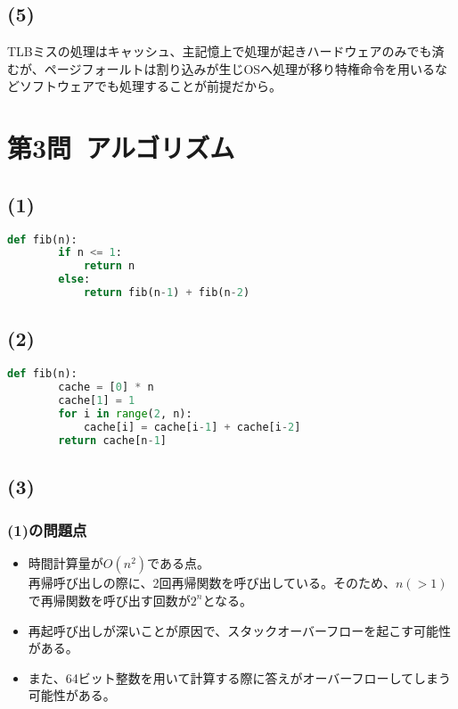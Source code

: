\documentclass[a4paper,12pt,xelatex,ja=standard]{bxjsarticle}
\begin{document}
  \subsection*{(5)}
  TLBミスの処理はキャッシュ、主記憶上で処理が起きハードウェアのみでも済むが、ページフォールトは割り込みが生じOSへ処理が移り特権命令を用いるなどソフトウェアでも処理することが前提だから。

\newpage
\section*{第3問\ アルゴリズム}
  \subsection*{(1)}
  \begin{lstlisting}[language=Python, caption=再帰呼び出し]
    def fib(n):
        if n <= 1:
            return n
        else:
            return fib(n-1) + fib(n-2)
  \end{lstlisting}

  \subsection*{(2)}
  \begin{lstlisting}[language=Python, caption=動的計画法]
    def fib(n):
        cache = [0] * n
        cache[1] = 1
        for i in range(2, n):
            cache[i] = cache[i-1] + cache[i-2]
        return cache[n-1]
  \end{lstlisting}

  \subsection*{(3)}
    \subsubsection*{(1)の問題点}
    \begin{itemize}
      \item 時間計算量が\(O(n^2)\)である点。\\
        再帰呼び出しの際に、2回再帰関数を呼び出している。そのため、\(n (> 1)\)で再帰関数を呼び出す回数が\(2^n\)となる。
      \item 再起呼び出しが深いことが原因で、スタックオーバーフローを起こす可能性がある。
      \item また、64ビット整数を用いて計算する際に答えがオーバーフローしてしまう可能性がある。
    \end{itemize}
\end{document}

